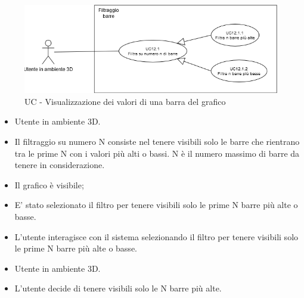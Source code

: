 \begin{figure}[h!]\centering
    \includegraphics[scale=0.7]{template/images/UC12.1.png}
    \caption{UC - Visualizzazione dei valori di una barra del grafico}
\end{figure}
\UCdsc
{ %
    \begin{itemize}
        \item Utente in ambiente 3D.
    \end{itemize}
}
{ %
    \begin{itemize}
        \item Il filtraggio su numero N consiste nel tenere visibili solo le barre che rientrano tra le prime N con i valori più alti o bassi. 
                N è il numero massimo di barre da tenere in considerazione.
    \end{itemize}
}
{ %
    \begin{itemize}
        \item Il grafico è visibile;
    \end{itemize}
}
{ %
    \begin{itemize}
        \item E' stato selezionato il filtro per tenere visibili solo le prime N barre più alte o basse.
    \end{itemize}
}
{ %
    \begin{itemize}
        \item L'utente interagisce con il sistema selezionando il filtro per tenere visibili solo le prime N barre più alte o basse.
    \end{itemize}
}
\UCdsc
{ %
    \begin{itemize}
        \item Utente in ambiente 3D.
    \end{itemize}
}
{ %
    \begin{itemize}
        \item L'utente decide di tenere visibili solo le N barre più alte.
    \end{itemize}
}
